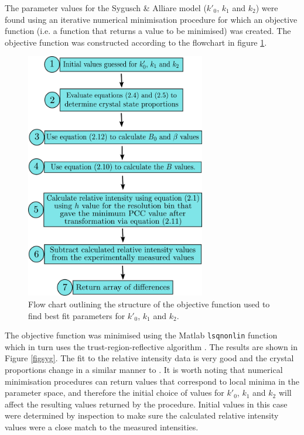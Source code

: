 The parameter values for the Sygusch \& Alliare model ($k'_0$, $k_1$ and $k_2$) were found using an iterative numerical minimisation procedure for which an objective function (i.e. a function that returns a value to be minimised) was created. The objective function was constructed according to the flowchart in figure \ref{figobjfun}.
\begin{figure}
  \centering
    \includegraphics[width=0.7\textwidth]{figures/dwd/objective_function_syg.pdf}
    \caption{Flow chart outlining the structure of the objective function used to find best fit parameters for $k'_0$, $k_1$ and $k_2$.}
    \label{figobjfun}
\end{figure}
The objective function was minimised using the Matlab \verb+lsqnonlin+ function which in turn uses the trust-region-reflective algorithm \cite{coleman1996}.
The results are shown in Figure \ref{figsyg}.
The fit to the relative intensity data is very good and the crystal proportions change in a similar manner to \cite{owen2014}.
It is worth noting that numerical minimisation procedures can return values that correspond to local minima in the parameter space, and therefore the initial choice of values for $k'_0$, $k_1$ and $k_2$ will affect the resulting values returned by the procedure.
Initial values in this case were determined by inspection to make sure the calculated relative intensity values were a close match to the measured intensities.
